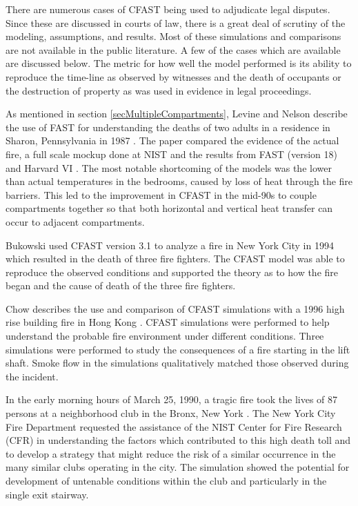 There are numerous cases of CFAST being used to adjudicate legal disputes. Since these are discussed in courts of law, there is a great deal of scrutiny of the modeling, assumptions, and results. Most of these simulations and comparisons are not available in the public literature. A few of the cases which are available are discussed below. The metric for how well the model performed is its ability to reproduce the time-line as observed by witnesses and the death of occupants or the destruction of property as was used in evidence in legal proceedings.

As mentioned in section \ref{secMultipleCompartments}, Levine and Nelson describe the use of FAST for understanding the deaths of two adults in a residence in Sharon, Pennsylvania in 1987 \cite{Valid:Levine}. The paper compared the evidence of the actual fire, a full scale mockup done at NIST and the results from FAST (version 18) \cite{Jones:1985} and Harvard VI \cite{Rockett:1985}. The most notable shortcoming of the models was the lower than actual temperatures in the bedrooms, caused by loss of heat through the fire barriers. This led to the improvement in CFAST in the mid-90s to couple compartments together so that both horizontal and vertical heat transfer can occur to adjacent compartments.

Bukowski used CFAST version 3.1 to analyze a fire in New York City \cite{Bukowski:1996} in 1994 which resulted in the death of three fire fighters. The CFAST model was able to reproduce the observed conditions and supported the theory as to how the fire began and the cause of death of the three fire fighters.

Chow describes the use and comparison of CFAST simulations with a 1996 high rise building fire in Hong Kong \cite{Chow:1996}. CFAST simulations were performed to help understand the probable fire environment under different conditions. Three simulations were performed to study the consequences of a fire starting in the lift shaft. Smoke flow in the simulations qualitatively matched those observed during the incident.

In the early morning hours of March 25, 1990, a tragic fire took the lives of 87 persons at a neighborhood club in the Bronx, New York \cite{Bukowski:1992}. The New York City Fire Department requested the assistance of the NIST Center for Fire Research (CFR) in understanding the factors which contributed to this high death toll and to develop a strategy that might reduce the risk of a similar occurrence in the many similar clubs operating in the city. The simulation showed the potential for development of untenable conditions within the club and particularly in the single exit stairway.


